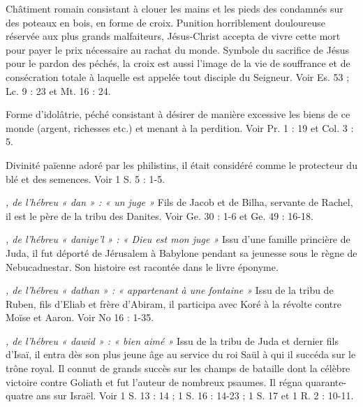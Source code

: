\begin{multicols}{2}
\textit{}\newline
Châtiment romain consistant à clouer les mains et les pieds des condamnés sur des poteaux en bois, en forme de croix. Punition horriblement douloureuse réservée aux plus grands malfaiteurs, Jésus-Christ accepta de vivre cette mort pour payer le prix nécessaire au rachat du monde. Symbole du sacrifice de Jésus pour le pardon des péchés, la croix est aussi l'image de la vie de souffrance et de consécration totale à laquelle est appelée tout disciple du Seigneur. Voir Es. 53 ; Lc. 9 : 23 et Mt. 16 : 24.

\textit{}\newline
Forme d’idolâtrie, péché consistant à désirer de manière excessive les biens de ce monde (argent, richesses etc.) et menant à la perdition. Voir Pr. 1 : 19 et Col. 3 : 5.

\textit{}\newline
Divinité païenne adoré par les philistins, il était considéré comme le protecteur du blé et des semences. Voir 1 S. 5 : 1-5.

\textit{, de l'hébreu « dan » : « un juge »}\newline
Fils de Jacob et de Bilha, servante de Rachel, il est le père de la tribu des Danites. Voir Ge. 30 : 1-6 et Ge. 49 : 16-18.

\textit{, de l'hébreu « daniye'l » : « Dieu est mon juge »}\newline
Issu d’une famille princière de Juda, il fut déporté de Jérusalem à Babylone pendant sa jeunesse sous le règne de Nebucadnestar. Son histoire est racontée dans le livre éponyme.

\textit{, de l'hébreu « dathan » : « appartenant à une fontaine »}\newline
Issu de la tribu de Ruben, fils d’Eliab et frère d’Abiram, il participa avec Koré à la révolte contre Moïse et Aaron. Voir No 16 : 1-35.

\textit{, de l'hébreu « dawid » : « bien aimé »}\newline
Issu de la tribu de Juda et dernier fils d'Isaï, il entra dès son plus jeune âge au service du roi Saül à qui il succéda sur le trône royal. Il connut de grands succès sur les champs de bataille dont la célèbre victoire contre Goliath et fut l’auteur de nombreux psaumes. Il régna quarante-quatre ans sur Israël. Voir 1 S. 13 : 14 ; 1 S. 16 : 14-23 ; 1 S. 17 et 1 R. 2 : 10-11.


\end{multicols}
